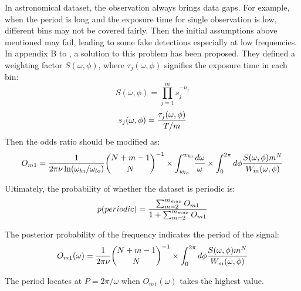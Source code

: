 \documentclass[twoside,twocolumn]{aastex63}
\begin{document}
In astronomical dataset, the observation always brings data gaps. For example, when the period is long and the exposure time for single observation is low, different bins may not be covered fairly. Then the initial assumptions above mentioned may fail, leading to some fake detections especially at low frequencies. In appendix B to \citep{1992ApJ...398..146G}, a solution to this problem has been proposed. They defined a weighting factor $S(\omega,\phi)$, where ${\tau_{j}(\omega,\phi)}$ signifies the exposure time in each bin:
\begin{equation}\label{A17}
S(\omega,\phi)={\prod_{j=1}^m s_j^{-n_j}}
\end{equation}
\begin{equation}
s_j(\omega,\phi)={{\tau_{j}(\omega,\phi)}\over {T/m}}
\end{equation}
\indent
Then the odds ratio should be modified as:
\begin{equation}\label{19}
O_{m1}={1\over{2\pi \nu \ln(\omega_{hi}/\omega_{lo})}} {{N+m-1}	\choose N}^{-1}\times {\int_{w_{lo}}^{w_{hi}}}{{d\omega}\over{\omega}}\times {\int_0^{2\pi}d\phi{S(\omega,\phi)m^N\over W_m(\omega,\phi)}} 
\end{equation}

Ultimately, the probability of whether the dataset is periodic is:
\begin{equation}\label{20}
p(periodic)={{\sum_{m=2}^{m_{max}} O_{m1}}\over {1+\sum_{m=2}^{m_{max}} O_{m1}}}
\end{equation}

The posterior probability of the frequency indicates the period of the signal:
\begin{equation}\label{19}
O_{m1}(\omega)={1\over{2\pi \nu}} {{N+m-1}	\choose N}^{-1} \times {\int_0^{2\pi}d\phi{S(\omega,\phi)m^N\over W_m(\omega,\phi)}} 
\end{equation}

The period locates at $P=2\pi /\omega $ when $O_{m1}(\omega)$ takes the highest value.
\end{document}
